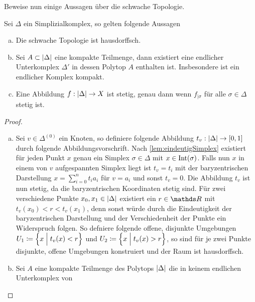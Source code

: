 Beweise nun einige Aussagen über die schwache Topologie.

\begin{Satz}
  Sei $\Delta$ ein Simplizialkomplex, so gelten folgende Aussagen
  \begin{enumerate}[(a)]
        \item Die schwache Topologie ist hausdorffsch.
        \item Sei $A \subset \left| \Delta \right|$ eine kompakte Teilmenge,
          dann existiert eine endlicher Unterkomplex $\Delta'$ in
          dessen Polytop $A$ enthalten ist. Insbesondere ist ein
          endlicher Komplex kompakt.
        \item Eine Abbildung $f: \left| \Delta \right| \rightarrow X$ ist
          stetig, genau dann wenn $f_{| \sigma}$ für alle
          $\sigma \in \Delta$ stetig ist.
	\end{enumerate}
	\begin{proof}
          \begin{enumerate}[(a)]
          \item Sei $v \in \Delta^{(0)}$ ein Knoten, so definiere
            folgende Abbildung
            $t_v : \left| \Delta \right| \rightarrow [0,1]$ durch folgende
            Abbildungsvorschrift.  Nach \cref{lem:eindeutigSimplex}
            existiert für jeden Punkt $x$ genau ein Simplex
            $\sigma \in \Delta$ mit $x \in \operatorname{Int}(\sigma)$. Falls nun
            $x$ in einem von $v$ aufgespannten Simplex liegt ist
            $t_v = t_i$ mit der baryzentrischen Darstellung
            $x = \sum^{n}_{i=0} t_i a_i$ für $v=a_i $ und sonst
            $t_v = 0$.  Die Abbildung $t_v$ ist nun stetig, da die
            baryzentrischen Koordinaten stetig sind. Für zwei
            verschiedene Punkte $x_0,x_1 \in \left| \Delta \right|$ existiert
            ein $r \in \R$ mit $t_v(x_0) < r < t_v(x_1)$, denn sonst
            würde durch die Eindeutigkeit der baryzentrischen
            Darstellung und der Verschiedenheit der Punkte ein
            Widerspruch folgen. So defniere folgende offene, disjunkte
            Umgebungen $U_1 \coloneqq \left\{ x \; \Big| \;  t_v(x)<r \right\}$ und
            $U_2 \coloneqq \left\{ x \; \Big| \;  t_v(x)>r \right\}$, so sind für je zwei
            Punkte disjunkte, offene Umgebungen konstruiert und der
            Raum ist hausdorffsch.
          \item Sei $A$ eine kompakte Teilmenge des Polytops
            $\left| \Delta \right|$ die in keinem endlichen Unterkomplex von

\end{enumerate}
\end{proof}
\end{Satz}

